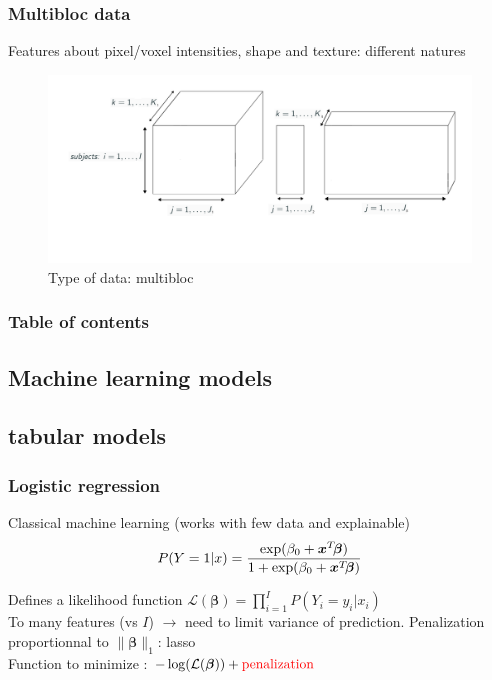 \documentclass{beamer}
\begin{document}
\begin{frame}
    \frametitle{Multibloc data}
    Features about pixel/voxel intensities, shape and texture: different natures
    \begin{figure}
        \centering
        \includegraphics[scale = 0.25]{images/blocks.png}
        \caption{Type of data: multibloc}
    \end{figure}
\end{frame}



\begin{frame}
    \frametitle{Table of contents}
    \tableofcontents
\end{frame}

\begin{frame}
    \section{Machine learning models}
    \subsection{tabular models}
\end{frame}

\begin{frame}
    \frametitle{Logistic regression}
    Classical machine learning (works with few data and explainable)\\[10 pt]

    $$P(Y = 1|x) = \frac{\exp(\beta_0 + \bm{x}^T\hspace{-2 pt}\bm{\beta})}{1 + \exp(\beta_0 + \bm{x}^T\hspace{-2 pt}\bm{\beta})}$$

    Defines a likelihood function $\mathcal{L}(\bm{\beta}) = \prod_{i = 1}^I P(Y_i = y_i|x_i)$\\[15 pt]

    To many features (vs $I$) $\rightarrow$ need to limit variance of prediction. Penalization proportionnal to $\lVert \bm{\beta} \rVert_1$: lasso\\[15 pt]

    Function to minimize : $- \log(\mathcal{L}(\bm{\beta})) + \text{\textcolor{red}{penalization}}$ 
\end{frame}
\end{document}
